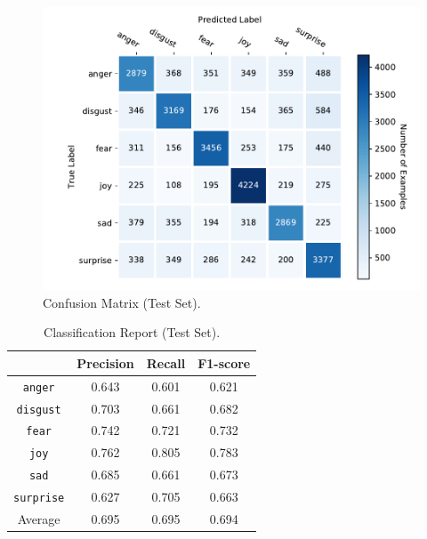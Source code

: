 \documentclass[11pt,a4paper]{article}
\begin{document}
\begin{figure}[!h]
    \centering
    \includegraphics[width=\columnwidth]{images/confusion_matrix.pdf}

    \caption{Confusion Matrix (Test Set).}


    \label{fig:confusion_matrix}
\end{figure}

\begin{table}[htpb]
    \centering
    \footnotesize
    
    \begin{tabular}{cccc}

        \toprule
                          & \textbf{Precision} & \textbf{Recall} & \textbf{F1-score} \\
        \midrule
        \texttt{anger}    & 0.643     & 0.601  & 0.621    \\
        \texttt{disgust}  & 0.703     & 0.661  & 0.682    \\
        \texttt{fear}     & 0.742     & 0.721  & 0.732    \\
        \texttt{joy}      & 0.762     & 0.805  & 0.783    \\
        \texttt{sad}      & 0.685     & 0.661  & 0.673    \\
        \texttt{surprise} & 0.627     & 0.705  & 0.663    \\
        \midrule
        Average           & 0.695     & 0.695  & 0.694    \\
        \bottomrule
    \end{tabular}

    \caption{Classification Report (Test Set).}

\label{table:classification_report}
\end{table}
\end{document}
